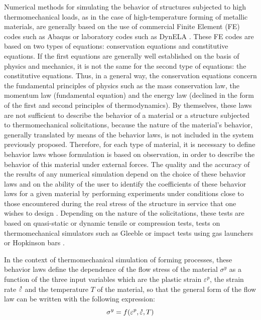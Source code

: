 \documentclass[algorithms,article,submit,pdftex,moreauthors]{Definitions/mdpi}
\DeclareRobustCommand{\mdot}[1]{\accentset{\mbox{\bfseries .}}{#1}}
\begin{document}
Numerical methods for simulating the behavior of structures subjected to high thermomechanical loads, as in the case of high-temperature forming of metallic materials, are generally based on the use of commercial Finite Element (FE) codes such as Abaqus or laboratory codes such as DynELA \cite{Pantale-2004}.
These FE codes are based on two types of equations: conservation equations and constitutive equations.
If the first equations are generally well established on the basis of physics and mechanics, it is not the same for the second type of equations: the constitutive equations.
Thus, in a general way, the conservation equations concern the fundamental principles of physics such as the mass conservation law, the momentum law (fundamental equation) and the energy law (declined in the form of the first and second principles of thermodynamics).
By themselves, these laws are not sufficient to describe the behavior of a material or a structure subjected to thermomechanical solicitations, because the nature of the material's behavior, generally translated by means of the behavior laws, is not included in the system previously proposed.
Therefore, for each type of material, it is necessary to define behavior laws whose formulation is based on observation, in order to describe the behavior of this material under external forces.
The quality and the accuracy of the results of any numerical simulation depend on the choice of these behavior laws and on the ability of the user to identify the coefficients of these behavior laws for a given material by performing experiments under conditions close to those encountered during the real stress of the structure in service that one wishes to design \cite{Dey-2007}.
Depending on the nature of the solicitations, these tests are based on quasi-static or dynamic tensile or compression tests, tests on thermomechanical simulators such as Gleeble \cite{Lin-2009} or impact tests using gas launchers or Hopkinson bars \cite{Kolsky-1949}.

In the context of thermomechanical simulation of forming processes, these behavior laws define the dependence \cite{Lee-2006} of the flow stress of the material $\sigma^y$ as a function of the three input variables which are the plastic strain $\varepsilon^p$, the strain rate $\mdot\varepsilon$ and the temperature $T$ of the material, so that the general form of the flow law can be written with the following expression:
\begin{equation}
\sigma^y = f\left(\varepsilon^p,\mdot\varepsilon,T\right)\label{eq:GenFlow}
\end{equation}
\end{document}
